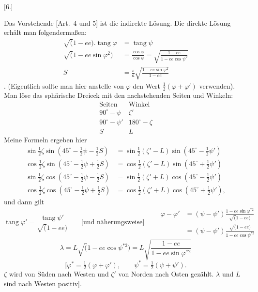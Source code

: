\clearpage
\noindent\makebox[12mm][l]{}\par\medskip
\begin{center}[6.]\end{center}
Das Vorstehende [Art.~4 und 5] ist die indirekte Lösung. Die direkte Lösung
erhält man folgendermaßen:
\[
\begin{aligned}
\surd(1-ee).\operatorname{tang}\varphi&=\operatorname{tang}\psi\\
\surd(1-ee\sin\varphi^2)&=\frac{\cos\varphi}{\cos\psi}
=\sqrt{\frac{1-ee}{1-ee\cos\psi^2}}\\
S&=\frac sa\sqrt{\frac{1-ee\sin\varphi^2}{1-ee}}
\end{aligned}
\]
.
(Eigentlich sollte man hier anstelle von \(\varphi\) den Wert \(\tfrac12(\varphi+\varphi')\) verwenden).
Man löse das sphärische Dreieck mit den nachstehenden Seiten und Winkeln:
\[
\begin{array}{c|c}
\text{Seiten}&\text{Winkel}\\\hline
90^\circ-\psi&\zeta'\\
90^\circ-\psi'&180^\circ-\zeta\\
S&L
\end{array}
\]
 Meine Formeln ergeben hier
\[
\begin{aligned}
\sin\tfrac12\zeta\sin(45^\circ-\tfrac12\psi-\tfrac12S)
&=\sin\tfrac12(\zeta'-L)\sin(45^\circ-\tfrac12\psi')\\
\cos\tfrac12\zeta\sin(45^\circ-\tfrac12\psi+\tfrac12S)
&=\cos\tfrac12(\zeta'-L)\sin(45^\circ+\tfrac12\psi')\\
\sin\tfrac12\zeta\cos(45^\circ-\tfrac12\psi-\tfrac12S)
&=\sin\tfrac12(\zeta'+L)\cos(45^\circ-\tfrac12\psi')\\
\cos\tfrac12\zeta\cos(45^\circ-\tfrac12\psi+\tfrac12S)
&=\cos\tfrac12(\zeta'+L)\cos(45^\circ+\tfrac12\psi'),
\end{aligned}
\]
\noindent und dann gilt
\[
\operatorname{tang}\varphi'=\frac{\operatorname{tang}\psi'}{\surd(1-ee)}
\qquad\text{[und näherungsweise]}\qquad
\begin{aligned}
\varphi-\varphi'&=(\psi-\psi')\frac{1-ee\sin\varphi^{*2}}{\surd(1-ee)}\\
&=(\psi-\psi')\frac{\surd(1-ee)}{1-ee\cos\psi^{*2}}
\end{aligned}
\]
\[
\lambda=L\surd(1-ee\cos\psi^{*2})
=L\sqrt{\frac{1-ee}{1-ee\sin\varphi^{*2}}}
\]
\[
[\varphi^*=\tfrac12(\varphi+\varphi'),\qquad
\psi^*=\tfrac12(\psi+\psi').
\]
\noindent\(\zeta\) wird von Süden nach Westen und \(\zeta'\) von Norden nach Osten gezählt. \(\lambda\) und \(L\) sind nach Westen positiv].

